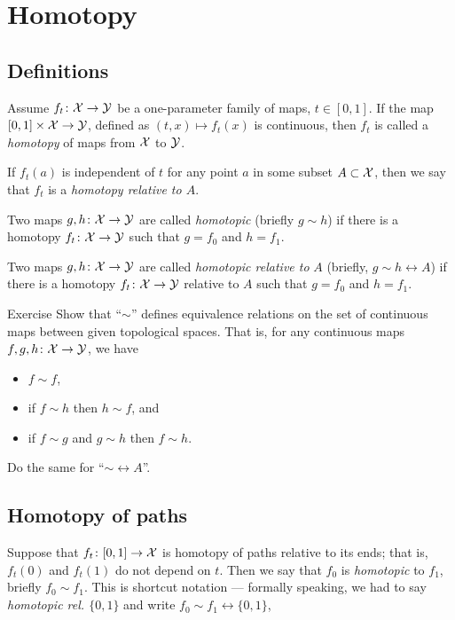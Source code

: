 \chapter{Homotopy}


\section{Definitions}

Assume $f_t\colon\mathcal{X}\to \mathcal{Y}$ be a one-parameter family of maps, $t\in [0,1]$.
If the map $[0,1]\times \mathcal{X}\to \mathcal{Y}$, defined as $(t,x)\mapsto f_t(x)$ is continuous, then $f_t$ is called a \emph{homotopy} of maps from $\mathcal{X}$ to $\mathcal{Y}$.

If $f_t(a)$ is independent of $t$ for any point $a$ in some subset $A\subset \mathcal{X}$, then we say that  $f_t$ is a \emph{homotopy relative to $A$}. 

Two maps $g,h\colon\mathcal{X}\to \mathcal{Y}$ are called \emph{homotopic} (briefly $g\sim h$)
if there is a homotopy $f_t\colon\mathcal{X}\to \mathcal{Y}$ such that $g=f_0$ and $h=f_1$.

Two maps $g,h\colon\mathcal{X}\to \mathcal{Y}$ are called \emph{homotopic relative to} $A$ (briefly, $g\sim h\rel A$)
if there is a homotopy $f_t\colon\mathcal{X}\to \mathcal{Y}$ relative to $A$ such that $g=f_0$ and $h=f_1$.

\begin{thm}{Exercise}\label{ex:hom-eq}
Show that ``$\sim$''  defines equivalence relations on the set of continuous maps between given topological spaces.
That is, for any continuous maps $f,g,h\colon\mathcal{X}\to \mathcal{Y}$, we have 
\begin{itemize}
\item $f\sim f$, 
\item if $f\sim h$ then $h\sim f$, and
\item if $f\sim g$ and $g\sim h$ then $f\sim h$.
\end{itemize}
Do the same for ``$\sim\rel A$''.
\end{thm}



\section{Homotopy of paths}

Suppose that $f_t\colon[0,1]\to\mathcal{X}$ is homotopy of paths relative to its ends;
that is, $f_t(0)$ and $f_t(1)$ do not depend on $t$.
Then we say that $f_0$ is \emph{homotopic} to  $f_1$, briefly $f_0\sim f_1$.
This is shortcut notation --- formally speaking, we had to say \emph{homotopic rel. $\{0,1\}$} and write $f_0\sim f_1\rel{\{0,1\}}$,

